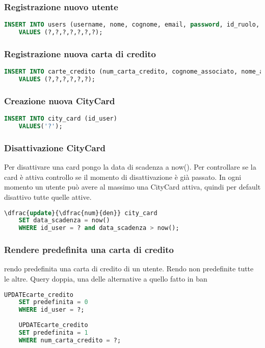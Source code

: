 \subsubsection{Registrazione nuovo utente}
\begin{lstlisting}[language=SQL]
	INSERT INTO users (username, nome, cognome, email, password, id_ruolo, data_creazione) 
	VALUES (?,?,?,?,?,?,?);
\end{lstlisting}

\subsubsection{Registrazione nuova carta di credito}
\begin{lstlisting}[language=SQL]
	INSERT INTO carte_credito (num_carta_credito, cognome_associato, nome_associato, mese_scadenza, anno_scadenza, id_user) 
	VALUES (?,?,?,?,?,?);
\end{lstlisting}

\subsubsection{Creazione nuova CityCard}
\begin{lstlisting}[language=SQL]
	INSERT INTO city_card (id_user) 
	VALUES('?');
\end{lstlisting}

\subsubsection{Disattivazione CityCard}
Per disattivare una card pongo la data di scadenza a now().
Per controllare se la card è attiva controllo se il momento di disattivazione è già passato.
In ogni momento un utente può avere al massimo una CityCard attiva,
quindi per default disattivo tutte quelle attive.
\begin{lstlisting}[language=SQL]
	\dfrac{update}{\dfrac{num}{den}} city_card
	SET data_scadenza = now()
	WHERE id_user = ? and data_scadenza > now();
\end{lstlisting}

\subsubsection{Rendere predefinita una carta di credito}
rendo predefinita una carta di credito di un utente. Rendo non predefinite tutte le altre. Query doppia, una delle alternative a quello fatto in ban
\begin{lstlisting}[language=SQL]
	UPDATEcarte_credito
	SET predefinita = 0
	WHERE id_user = ?;
	
	UPDATEcarte_credito
	SET predefinita = 1
	WHERE num_carta_credito = ?;
\end{lstlisting}

